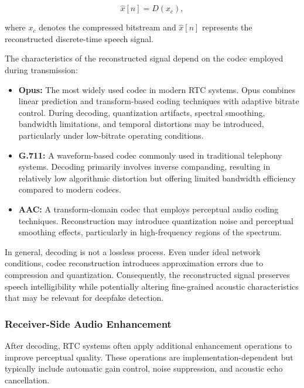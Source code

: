 \begin{equation}
\hat{x}[n] = D(x_c),
\end{equation}

where $x_c$ denotes the compressed bitstream and $\hat{x}[n]$ represents the reconstructed discrete-time speech signal.

The characteristics of the reconstructed signal depend on the codec employed during transmission:

\begin{itemize}
\item \textbf{Opus:} The most widely used codec in modern RTC systems. Opus combines linear prediction and transform-based coding techniques with adaptive bitrate control. During decoding, quantization artifacts, spectral smoothing, bandwidth limitations, and temporal distortions may be introduced, particularly under low-bitrate operating conditions.

\item \textbf{G.711:} A waveform-based codec commonly used in traditional telephony systems. Decoding primarily involves inverse companding, resulting in relatively low algorithmic distortion but offering limited bandwidth efficiency compared to modern codecs.

\item \textbf{AAC:} A transform-domain codec that employs perceptual audio coding techniques. Reconstruction may introduce quantization noise and perceptual smoothing effects, particularly in high-frequency regions of the spectrum.

\end{itemize}

In general, decoding is not a lossless process. Even under ideal network conditions, codec reconstruction introduces approximation errors due to compression and quantization. Consequently, the reconstructed signal preserves speech intelligibility while potentially altering fine-grained acoustic characteristics that may be relevant for deepfake detection. 

\subsubsection{Receiver-Side Audio Enhancement}

After decoding, RTC systems often apply additional enhancement operations to improve perceptual quality. These operations are implementation-dependent but typically include automatic gain control, noise suppression, and acoustic echo cancellation.

